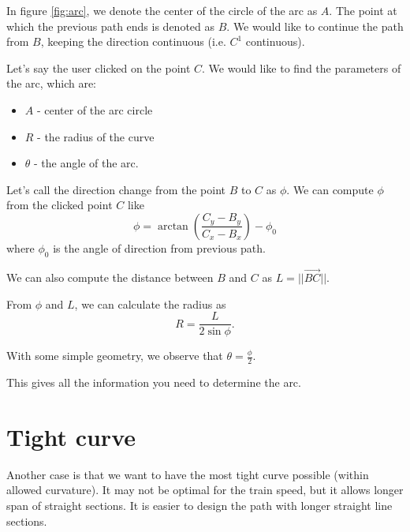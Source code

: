 \documentclass{article}
\begin{document}
In figure \ref{fig:arc}, we denote the center of the circle of the arc as $A$.
The point at which the previous path ends is denoted as $B$.
We would like to continue the path from $B$, keeping the direction continuous (i.e. $C^1$ continuous).

Let's say the user clicked on the point $C$.
We would like to find the parameters of the arc, which are:
\begin{itemize}
    \item $A$ - center of the arc circle
    \item $R$ - the radius of the curve
    \item $\theta$ - the angle of the arc.
\end{itemize}

Let's call the direction change from the point $B$ to $C$ as $\phi$.
We can compute $\phi$ from the clicked point $C$ like
$$
\phi = \arctan\left({\frac{C_y - B_y}{C_x - B_x}}\right) - \phi_0
$$
where $\phi_0$ is the angle of direction from previous path.

We can also compute the distance between $B$ and $C$ as $L = ||\vec{BC}||$.

From $\phi$ and $L$, we can calculate the radius as
$$
R = \frac{L}{2 \sin\phi}.
$$

With some simple geometry, we observe that $\theta=\frac{\phi}{2}$.

This gives all the information you need to determine the arc.

\section{Tight curve}

Another case is that we want to have the most tight curve possible (within allowed curvature).
It may not be optimal for the train speed, but it allows longer span of straight sections.
It is easier to design the path with longer straight line sections.
\end{document}
